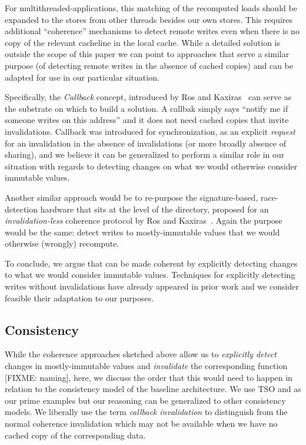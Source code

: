 For multithreaded-applications, this matching of the recomputed loads should be expanded to the stores from other threads besides our own stores. This requires additional ``coherence'' mechanisms to detect remote writes even when there is no copy of the relevant cacheline in the local cache. While a detailed solution is outside the scope of this paper we can point to approaches that serve a similar purpose (of detecting remote writes in the absence of cached copies) and can be adapted for use in our particular situation. 

Specifically, the \emph{Callback} concept, introduced by Ros and Kaxiras~\cite{aros-isca15} can serve as the substrate on which to build a solution. A callbak simply says ``notify me if someone writes on this address'' and it does not need cached copies that invite invalidations. Callback was introduced for synchronization, as an explicit \emph{request} for an invalidation in the absence of invalidations (or more broadly absence of sharing), and we believe it can be generalized to perform a similar role in our situation with regards to detecting changes on what we would otherwise consider immutable values. 

Another similar approach would be to re-purpose the signature-based, race-detection hardware that sits at the level of the directory, proposed for an \emph{invalidation-less} coherence protocol by Ros and Kaxiras~\cite{aros-micro16}. Again the purpose would be the same: detect writes to mostly-immutable values that we would otherwise (wrongly) recompute.

To conclude, we argue that \recomp can be made coherent by explicitly detecting changes to what we would consider immutable values. Techniques for explicitly detecting writes without invalidations have already appeared in prior work and we consider feasible their adaptation to our purposes.

\subsection{Consistency}
\label{sec:consistency}
While the coherence approaches sketched above allow us to \emph{explicitly detect} changes in mostly-immutable values and \emph{invalidate} the corresponding \recomp function {\color{red} [FIXME: naming]}, here, we discuss the order that this would need to happen in relation to the consistency model of the baseline architecture.
We use TSO and \rc as our prime examples but our reasoning can be generalized to other consistency models. We liberally use the term \emph{callback invalidation} to distinguish from the normal coherence invalidation which may not be available when we have no cached copy of the corresponding data.

